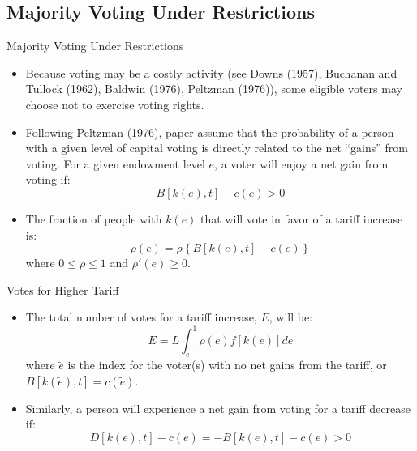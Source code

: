 \documentclass[aspectratio=169]{beamer}
\begin{document}

\subsection{Majority Voting Under Restrictions}


\begin{frame}{Majority Voting Under Restrictions}

\begin{itemize}
    \item<1-> Because voting may be a costly activity (see Downs (1957), Buchanan and Tullock (1962), Baldwin (1976), Peltzman (1976)), some eligible voters may choose not to exercise voting rights.
    \item<2-> Following Peltzman (1976), paper assume that the probability of a person with a given level of capital voting is directly related to the net “gains” from voting.  For a given endowment level $ e $, a voter will enjoy a net gain from voting if:
    \begin{equation*}
        B\left[ k\left( e \right), t \right] - c\left( e \right) > 0
    \end{equation*}
    \item<3-> The fraction of people with $ k \left( e \right) $ that will vote in favor of a tariff increase is: 
    \begin{equation*}
        \rho\left( e \right) = \rho\left\{ B\left[ k\left( e \right), t \right] - c\left( e \right) \right\}
    \end{equation*}
    where $ 0 \le \rho \le 1 $ and $ \rho'\left( e \right) \ge 0 $.
\end{itemize}
    
\end{frame}


\begin{frame}{Votes for Higher Tariff}

\begin{itemize}
    \item<1-> The total number of votes for a tariff increase, $ E $, will be:
    \begin{equation*}
        E = L \int_{\tilde{e}}^{1} \rho\left( e \right) f\left[ k\left( e \right) \right] de
    \end{equation*}
    where $ \tilde{e} $ is the index for the voter(s) with no net gains from the tariff, or $ B\left[ k\left( \tilde{e} \right), t \right] = c\left( \tilde{e} \right) $.
    \item<2-> Similarly, a person will experience a net gain from voting for a tariff decrease if:
    \begin{equation*}
        D\left[ k\left( e \right), t \right] - c\left( e \right) = -B\left[ k\left( e \right), t \right] - c\left( e \right) > 0
    \end{equation*}
\end{itemize}
    
\end{frame}
\end{document}
